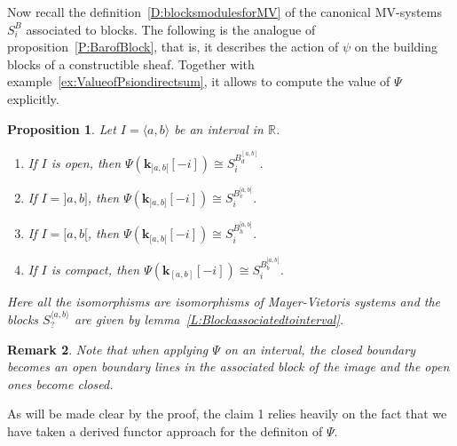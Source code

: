 \documentclass[a4paper, english, 11pt]{article}
\newcommand{\kk}[0]{\textbf{k}}
\newcommand{\0}{\vec{0}}
\newcommand{\R}[0]{\mathbb{R}}
\newtheorem{prop}{Proposition}[section]
\newtheorem{remark}[prop]{Remark}
\begin{document}
Now recall the definition~\ref{D:blocksmodulesforMV} of the canonical MV-systems $S_i^B$ associated to blocks. The following is the analogue of proposition~\ref{P:BarofBlock}, that is, it describes the action of $\psi$ on the building blocks of a constructible sheaf. Together with example~\ref{ex:ValueofPsiondirectsum}, it allows to compute the value of $\Psi$ explicitly. 
\begin{prop}\label{P:PsionIntervals}  Let $I=\langle a, b\rangle$ be an interval in $\R$. 
\begin{enumerate}
    \item If $I$ is open, then  $\Psi ({\kk_{]a, b[}}[-i]) \cong 
S_i^{B_{d}^{[ a, b ]}}$.
    \item If $I=]a,b]$, then  $\Psi ({ \kk_{] a, b]}}[-i]) \cong 
S_i^{B_{v}^{[ a, b[}}$.
    \item If $I=[a, b[$, then  $\Psi ({ \kk_{[ a, b[}}[-i]) \cong 
S_i^{B_{h}^{]a, b]}}$. 
    \item If $I$ is compact, then  $\Psi ({ \kk_{[a, b]}}[-i]) \cong 
S_i^{B_{b}^{]a, b[}}$. 
\end{enumerate}
Here all the isomorphisms are isomorphisms of Mayer-Vietoris systems and the blocks $S_{?}^{\langle a, b\rangle}$ are given by lemma~\ref{L:Blockassociatedtointerval}. 
\end{prop}
\begin{remark}
 Note that when applying $\Psi$ on an interval, the closed boundary becomes an open boundary lines in the associated block of the image and the open ones  become closed.
\end{remark}

As will be made clear by the proof, the claim 1  relies heavily on the fact that we have taken a derived functor approach for the definiton of $\Psi$. 
\end{document}
